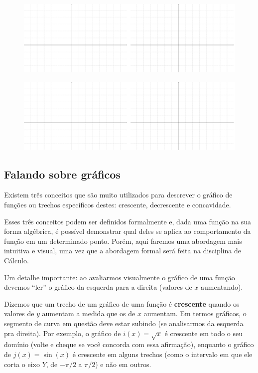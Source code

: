 \documentclass[main_estudante.tex]{subfiles}
\begin{document}
\begin{figure}[h]
\centering
\includegraphics[width=\textwidth]{./img/c7q1.png}
\end{figure}

\begin{figure}[h]
\centering
\includegraphics[width=\textwidth]{./img/c7q1.png}
\end{figure}

\newpage


\subsection*{Falando sobre gráficos}

Existem três conceitos que são muito utilizados para descrever o gráfico de funções ou trechos específicos destes: crescente, decrescente e concavidade.

Esses três conceitos podem ser definidos formalmente e, dada uma função na sua forma algébrica, é possível demonstrar qual deles se aplica ao comportamento da função em um determinado ponto. Porém, aqui faremos uma abordagem mais intuitiva e visual, uma vez que a abordagem formal será feita na disciplina de Cálculo.

Um detalhe importante: ao avaliarmos visualmente o gráfico de uma função devemos ``ler'' o gráfico da esquerda para a direita (valores de $x$ aumentando).

Dizemos que um trecho de um gráfico de uma função é \textbf{crescente} quando os valores de $y$ aumentam a medida que os de $x$ aumentam. Em termos gráficos, o segmento de curva em questão deve estar subindo (se analisarmos da esquerda pra direita). Por exemplo, o gráfico de $i(x)=\sqrt{x}$ é crescente em todo o seu domínio (volte e cheque se você concorda com essa afirmação), enquanto o gráfico de $j(x)=\sin(x)$ é crescente em alguns trechos (como o intervalo em que ele corta o eixo $Y$, de $-\pi/2$ a $\pi/2$) e não em outros.
\end{document}
